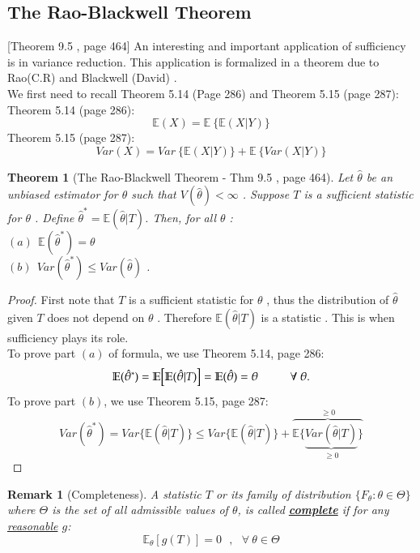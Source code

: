 \documentclass[14pt,twoside,a4paper,fleqn]{article}
\theoremstyle{plain}
\newtheorem*{theorem*}{Theorem}
\newtheorem*{remark*}{Remark}
\begin{document}
\subsection{The Rao-Blackwell Theorem}[Theorem 9.5 , page 464]
An interesting and important application of sufficiency is in variance reduction. This application is formalized in a theorem due to Rao(C.R) and Blackwell (David) .\\
We first need to recall Theorem 5.14 (Page 286) and Theorem 5.15 (page 287):
\tab Theorem 5.14 (page 286):
$$
	\mathbb{E}(X) = \mathbb{E}\ \big\{\mathbb{E}(X | Y)\big\}
$$
\tab Theorem 5.15 (page 287):
$$
	Var(X) = Var\ \big\{\mathbb{E}(X | Y)\big\} + \mathbb{E}\ \big\{Var(X|Y)\big\}
$$
\begin{theorem*}[The Rao-Blackwell Theorem - Thm 9.5 , page 464]
Let $\hat{\theta}$ be an unbiased estimator for $\theta$ such that $V(\hat{\theta})<\infty$ . Suppose $T$ is a sufficient statistic for $\theta$ . Define \mbox{$\hat{\theta}^{*}=\mathbb{E}(\hat{\theta}\big| T)$}. Then, for all $\theta$ :\\
\tab $(a) \ \ \mathbb{E}(\hat{\theta}^{*}) = \theta$\\
\tab $(b) \ \ Var(\hat{\theta}^{*}) \leq Var(\hat{\theta})$ .
\end{theorem*}
\begin{proof}
	First note that $T$ is a sufficient statistic for $\theta$ , thus the distribution of $\hat{\theta}$ given $T$ does not depend on $\theta$ . Therefore $\mathbb{E}(\hat{\theta} | T)$ is a statistic . This is when sufficiency plays its role.\\
	To prove part $(a)$ of formula, we use Theorem 5.14, page 286:
	$$
		\mathbb{E}(\hat{\theta}^{*}) = \mathbb{E}\big[\mathbb{E}(\hat{\theta} | T) \big] = \mathbb{E}(\hat{\theta}) = \theta\hspace*{1cm} \forall \ \theta .
	$$
To prove part $(b)$, we use Theorem 5.15, page 287:
$$
	Var(\hat{\theta}^{*}) = Var\big\{\mathbb{E}(\hat{\theta} | T)\big\} \leq Var\big\{\mathbb{E}(\hat{\theta} | T)\big\} + 
	\overbrace{\mathbb{E}\{\underbrace{Var(\hat{\theta}| T)}_{\geq 0}\}}^{\geq 0}
$$
\end{proof}
\begin{remark*}[Completeness] A statistic $T$ or its family of distribution \mbox{$\{F_{\theta} \colon \theta\in\Theta\}$} where $\Theta$ is the set of all admissible values of $\theta$, is called \textbf{\underline{complete}}  if for any \underline{reasonable} $g$:
$$
	\mathbb{E}_{\theta}[g(T)] = 0 \ \ \ , \ \ \ \forall\ \theta\in\Theta
$$
\end{remark*}
\end{document}
